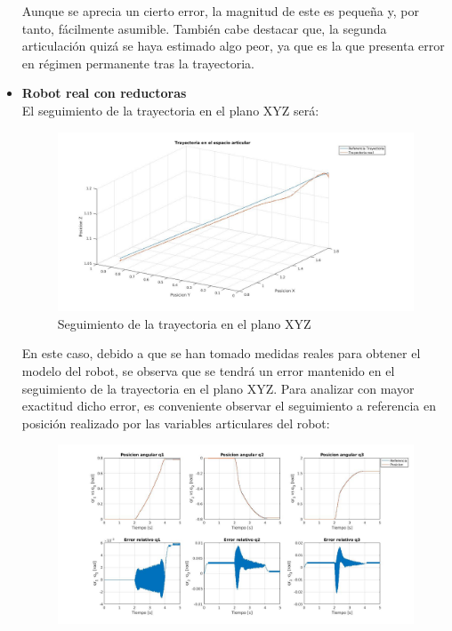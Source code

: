\begin{itemize}
	Aunque se aprecia un cierto error, la magnitud de este es pequeña y, por tanto, fácilmente asumible. También cabe destacar que, la segunda articulación quizá se haya estimado algo peor, ya que es la que presenta error en régimen permanente tras la trayectoria. \\



	\item \textbf{Robot real con reductoras} \\

	El seguimiento de la trayectoria en el plano XYZ será:



	\begin{figure}[h!]

		\centering

		\includegraphics[width=.8\textwidth]{exp3_trayPDreal}

		\caption{Seguimiento de la trayectoria en el plano XYZ}

	\end{figure}



	En este caso, debido a que se han tomado medidas reales para obtener el modelo del robot, se observa que se tendrá un error mantenido en el seguimiento de la trayectoria en el plano XYZ. Para analizar con mayor exactitud dicho error, es conveniente observar el seguimiento a referencia en posición realizado por las variables articulares del robot:



	\begin{figure}[h!]

		\centering

		\includegraphics[width=.8\textwidth]{exp3_posPDrealCR}


\end{figure}
\end{itemize}
